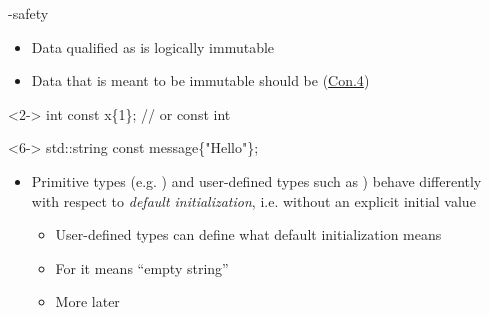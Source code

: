 \begin{frame}[fragile]{-safety}

  \begin{itemize}
  \item Data qualified as  is logically immutable
  \item Data that is meant to be immutable should be 
    (\href{https://isocpp.github.io/CppCoreGuidelines/CppCoreGuidelines#con4-use-const-to-define-objects-with-values-that-do-not-change-after-construction}{Con.4})
  \end{itemize}

  \begin{codeblock}<2->{
int \alert{const} x\{1\}; // or const int
}\end{codeblock}

\begin{codeblock}<6->{
std::string \alert{const} message\{"Hello"\};
}\end{codeblock}

  \begin{itemize}[<10->]
  \item Primitive types (e.g. ) and user-defined types such as
    ) behave differently with respect to \textit{default
      initialization}, i.e. without an explicit initial value
    \begin{itemize}
    \item User-defined types can define what default initialization means
    \item For  it means ``empty string''
    \item More later
    \end{itemize}
  \end{itemize}

\end{frame}
